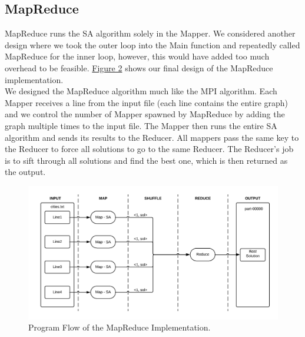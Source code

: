 \documentclass{article}
\begin{document}
		\subsection{MapReduce} \label{D_MR}
		    MapReduce runs the SA algorithm solely in the Mapper. We considered another design where we took the outer loop into the Main function and repeatedly called MapReduce for the inner loop, however, this would have added too much overhead to be feasible. \hyperref[F2]{Figure 2} shows our final design of the MapReduce implementation. \\
			
			We designed the MapReduce algorithm much like the MPI algorithm. Each Mapper receives a line from the input file (each line contains the entire graph) and we control the number of Mapper spawned by MapReduce by adding the graph multiple times to the input file. The Mapper then runs the entire SA algorithm and sends its results to the Reducer. All mappers pass the same key to the Reducer to force all solutions to go to the same Reducer. The Reducer's job is to sift through all solutions and find the best one, which is then returned as the output. \\
			
			\begin{figure}\label{F2}
				\caption{Program Flow of the MapReduce Implementation.}
				\centering
				\includegraphics[scale=0.6]{mapreduce_flow.png}
			\end{figure}
		
\end{document}
